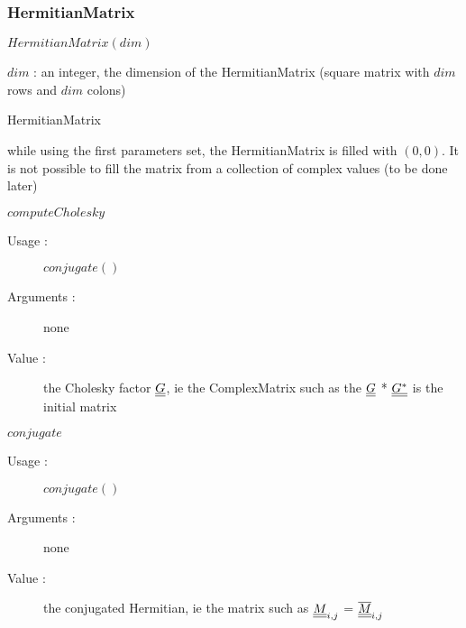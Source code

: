 \newpage \subsubsection{HermitianMatrix}
\begin{description}

\item[Usage :] \rule{0pt}{1em}
  \begin{description}
  \item $HermitianMatrix(dim)$
  \item
  \end{description}

\item[Arguments :]  \rule{0pt}{1em}
  \begin{description}
  \item $dim$      :        an integer, the dimension of the HermitianMatrix
    (square matrix with $dim$ rows and $dim$ colons)
  \end{description}

\item[Value :] HermitianMatrix
  \begin{description}
  \item while using the first parameters set, the HermitianMatrix is filled with $(0, 0)$. It is not possible to fill the matrix from a collection of complex values (to be done later)
  \end{description}

\item[Some methods :]  \rule{0pt}{1em}


   \item $computeCholesky$
    \begin{description}
    \item[Usage :] $conjugate()$
    \item[Arguments :] none
    \item[Value :] the Cholesky factor ${\underline{\underline{G}}}$, ie the ComplexMatrix such as the ${\underline{\underline{G}}}$ * ${\underline{\underline{G^{*}}}}$ is the initial matrix
    \end{description}
    \bigskip

 \item $conjugate$
    \begin{description}
    \item[Usage :] $conjugate()$
    \item[Arguments :] none
    \item[Value :] the conjugated Hermitian, ie the matrix such as ${\underline{\underline{M}}}_{i,j}$ = ${\underline{\underline{\overline{M}}}}_{i,j}$
    \end{description}
    \bigskip


\end{description}
